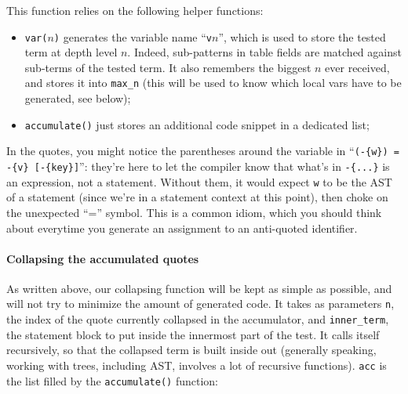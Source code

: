 This function relies on the following helper functions:
\begin{itemize}
\item {\tt var($n$)} generates the variable name ``\verb|v|$n$'', which
  is used to store the tested term at depth level $n$. Indeed,
  sub-patterns in table fields are matched against sub-terms of the
  tested term. It also remembers the biggest $n$ ever received, 
  and stores it into \verb|max_n| (this will be used to know which
  local vars have to be generated, see below);
\item {\tt accumulate()} just stores an additional code snippet in a
  dedicated list;
\end{itemize}

In the quotes, you might notice the parentheses around the variable in
``\verb|(-{w}) = -{v} [-{key}]|'': they're here to let the compiler
know that what's in \verb|-{...}| is an expression, not a
statement. Without them, it would expect {\tt w} to be the AST of a
statement (since we're in a statement context at this point), then
choke on the unexpected ``='' symbol. This is a common idiom, which
you should think about everytime you generate an assignment to an
anti-quoted identifier.

\paragraph{Collapsing the accumulated quotes}
As written above, our collapsing function will be kept as simple
as possible, and will not try to minimize the amount of generated
code. It takes as parameters {\tt n}, the index of the quote currently
collapsed in the accumulator, and {\tt inner\_term}, the statement
block to put inside the innermost part of the test. It calls itself
recursively, so that the collapsed term is built inside out (generally
speaking, working with trees, including AST, involves a lot of
recursive functions). \verb|acc| is the list filled by the
\verb|accumulate()| function:

